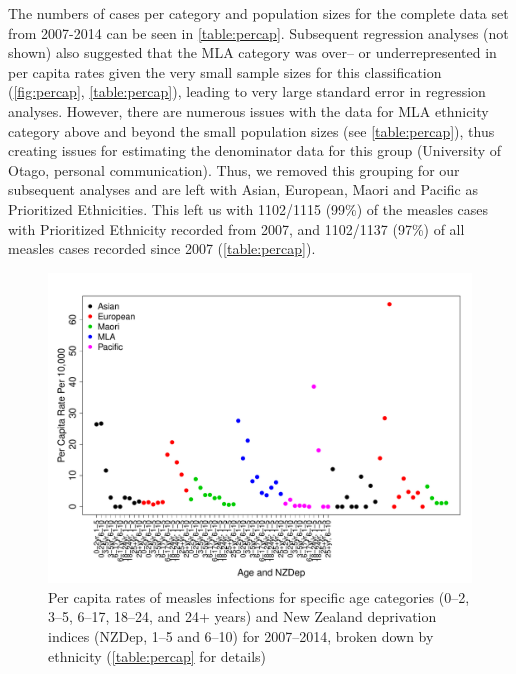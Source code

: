 \documentclass{article}
\begin{document}
The numbers of cases per category and population sizes for the complete data set from 2007-2014 can be seen in \autoref{table:percap}. Subsequent regression analyses (not shown) also suggested that the MLA category was over-- or underrepresented in per capita rates given the very small sample sizes for this classification (\autoref{fig:percap}, \autoref{table:percap}), leading to very large standard error in regression analyses. However, there are numerous issues with the data for MLA ethnicity category above and beyond the small population sizes (see \autoref{table:percap}), thus creating issues for estimating the denominator data for this group (University of Otago, personal communication). Thus, we removed this grouping for our subsequent analyses and are left with Asian, European, Maori and Pacific as Prioritized Ethnicities. This left us with 1102/1115 (99\%) of the measles cases with Prioritized Ethnicity recorded from 2007, and 1102/1137 (97\%) of all measles cases recorded since 2007 (\autoref{table:percap}).

\begin{figure}
\begin{center}
\includegraphics{draftfinalreport_v2-019}
\end{center}
\caption{Per capita rates of measles infections for specific age categories (0--2, 3--5, 6--17, 18--24, and 24+ years) and New Zealand deprivation indices (NZDep, 1--5 and 6--10) for 2007--2014, broken down by ethnicity (\autoref{table:percap} for details)}
\label{fig:percap}
\end{figure}
\end{document}
